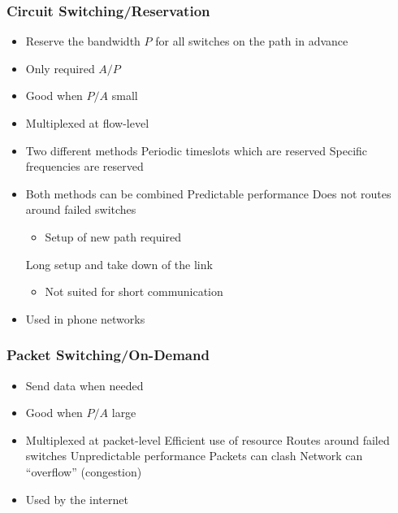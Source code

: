\subsubsection{Circuit Switching/Reservation}
\begin{itemize}
    \item Reserve the bandwidth $P$ for all switches on the path in advance
    \item Only required $A/P$
    \item Good when $P/A$ small
    \item Multiplexed at flow-level
    \item Two different methods
     Periodic timeslots which are reserved
     Specific frequencies are reserved
    \item Both methods can be combined
    \ipro Predictable performance
    \icon Does not routes around failed switches
        \begin{itemize}
            \item Setup of new path required
        \end{itemize}
    \icon Long setup and take down of the link
        \begin{itemize}
            \item Not suited for short communication
        \end{itemize}
    \item Used in phone networks
\end{itemize}

\subsubsection{Packet Switching/On-Demand}
\begin{itemize}
    \item Send data when needed
    \item Good when $P/A$ large
    \item Multiplexed at packet-level
    \ipro Efficient use of resource
    \ipro Routes around failed switches
    \icon Unpredictable performance
    \icon Packets can clash
    \icon Network can ``overflow'' (congestion)
    \item Used by the internet
\end{itemize}

